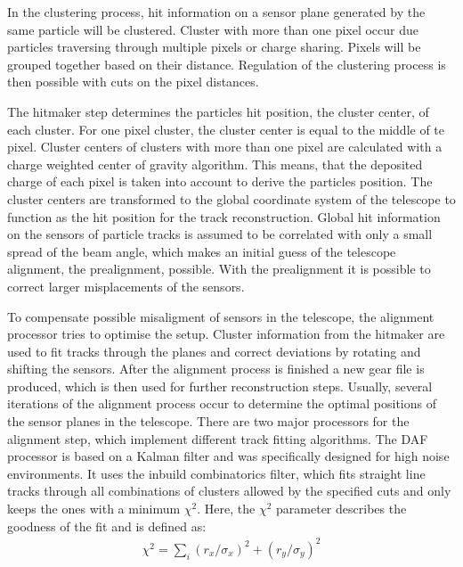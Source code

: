 In the clustering process, hit information on a sensor plane generated by the same particle will be clustered. Cluster with more than one pixel occur due
particles traversing through multiple pixels or charge sharing. Pixels will be grouped together based on their distance.
Regulation of the clustering process is then possible with cuts on the pixel distances.

The hitmaker step determines the particles hit position, the cluster center, of each cluster. For one pixel cluster, the cluster center is equal to the middle of
te pixel. Cluster centers of clusters with more than one pixel are calculated with a charge weighted center of gravity algorithm. This means, that
the deposited charge of each pixel is taken into account to derive the particles position. The cluster centers are transformed to the global coordinate
system of the telescope to function as the hit position for the track reconstruction. Global hit information on the sensors of particle tracks is assumed to be correlated with only
a small spread of the beam angle, which makes an initial guess of the telescope alignment, the prealignment, possible. With the prealignment it is possible
to correct larger misplacements of the sensors.

To compensate possible misaligment of sensors in the telescope, the alignment processor tries to optimise the setup. Cluster information from the hitmaker
are used to fit tracks through the planes and correct deviations by rotating and shifting the sensors. After the alignment process is finished a new gear file is produced, which
is then used for further reconstruction steps. Usually, several iterations of the alignment process occur to determine the optimal positions of the sensor planes
in the telescope.
There are two major processors for the alignment step, which implement different track fitting algorithms.
The DAF processor is based on a Kalman filter and was specifically designed for high noise environments. It uses the inbuild combinatorics filter, which fits
straight line tracks through all combinations of clusters allowed by the specified cuts and only keeps the ones with a minimum $\chi^2$. Here, the $\chi^2$ parameter
describes the goodness of the fit and is defined as:
\begin{align} \label{eqn:chi}
  \chi^2 = \sum_i (r_x/\sigma_x)^2 + (r_y/\sigma_y)^2
\end{align}

